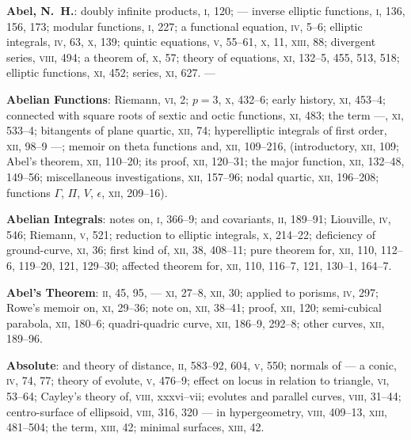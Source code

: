 \documentclass[11pt,a4paper]{book}
\begin{document}
\textbf{Abel, N.~H.}: doubly infinite products, \textsc{i}, 120; --- inverse elliptic functions, \textsc{i}, 136, 156, 173; modular functions, \textsc{i}, 227; a functional equation, \textsc{iv}, 5--6; elliptic integrals, \textsc{iv}, 63, \textsc{x}, 139; quintic equations, \textsc{v}, 55--61, \textsc{x}, 11, \textsc{xiii}, 88; divergent series, \textsc{viii}, 494; a theorem of, \textsc{x}, 57; theory of equations, \textsc{xi}, 132--5, 455, 513, 518; elliptic functions, \textsc{xi}, 452; series, \textsc{xi}, 627. ---

\vspace{0.4em}
\textbf{Abelian Functions}: Riemann, \textsc{vi}, 2; $p = 3$, \textsc{x}, 432--6; early history, \textsc{xi}, 453--4; connected with square roots of sextic and octic functions, \textsc{xi}, 483; the term ---, \textsc{xi}, 533--4; bitangents of plane quartic, \textsc{xii}, 74; hyperelliptic integrals of first order, \textsc{xii}, 98--9 ---; memoir on theta functions and, \textsc{xii}, 109--216, (introductory, \textsc{xii}, 109; Abel's theorem, \textsc{xii}, 110--20; its proof, \textsc{xii}, 120--31; the major function, \textsc{xii}, 132--48, 149--56; miscellaneous investigations, \textsc{xii}, 157--96; nodal quartic, \textsc{xii}, 196--208; functions $\Gamma$, $\Pi$, $V$, $\epsilon$, \textsc{xii}, 209--16).

\vspace{0.4em}
\textbf{Abelian Integrals}: notes on, \textsc{i}, 366--9; and covariants, \textsc{ii}, 189--91; Liouville, \textsc{iv}, 546; Riemann, \textsc{v}, 521; reduction to elliptic integrals, \textsc{x}, 214--22; deficiency of ground-curve, \textsc{xi}, 36; first kind of, \textsc{xii}, 38, 408--11; pure theorem for, \textsc{xii}, 110, 112--6, 119--20, 121, 129--30; affected theorem for, \textsc{xii}, 110, 116--7, 121, 130--1, 164--7.

\vspace{0.4em}
\textbf{Abel's Theorem}: \textsc{ii}, 45, 95, --- \textsc{xi}, 27--8, \textsc{xii}, 30; applied to porisms, \textsc{iv}, 297; Rowe's memoir on, \textsc{xi}, 29--36; note on, \textsc{xii}, 38--41; proof, \textsc{xii}, 120; semi-cubical parabola, \textsc{xii}, 180--6; quadri-quadric curve, \textsc{xii}, 186--9, 292--8; other curves, \textsc{xii}, 189--96.

\vspace{0.4em}
\textbf{Absolute}: and theory of distance, \textsc{ii}, 583--92, 604, \textsc{v}, 550; normals of --- a conic, \textsc{iv}, 74, 77; theory of evolute, \textsc{v}, 476--9; effect on locus in relation to triangle, \textsc{vi}, 53--64; Cayley's theory of, \textsc{viii}, xxxvi--vii; evolutes and parallel curves, \textsc{viii}, 31--44; centro-surface of ellipsoid, \textsc{viii}, 316, 320 --- in hypergeometry, \textsc{viii}, 409--13, \textsc{xiii}, 481--504; the term, \textsc{xiii}, 42; minimal surfaces, \textsc{xiii}, 42.
\end{document}
